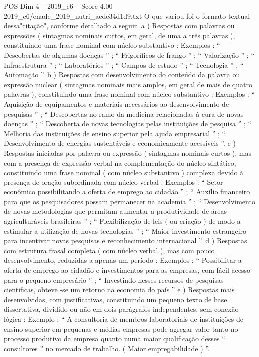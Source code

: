 \begin{textsample}{POS Dim 4 – 2019\_c6 – Score 4.00 – 2019\_c6/enade\_2019\_nutri\_acdc34d1d9.txt}
O que variou foi o formato textual dessa"citação", conforme detalhado a seguir. a ) Respostas com palavras ou expressões ( sintagmas nominais curtos, em geral, de uma a três palavras ), constituindo uma frase nominal com núcleo substantivo : Exemplos : “ Descobertas de algumas doenças ” ; “ Frigoríficos de frango ” ; “ Valorização ” ; “ Infraestrutura ” ; “ Laboratórios ” ; “ Campos de estudo ” ; “ Tecnologia ” ; “ Automação ”. b ) Respostas com desenvolvimento do conteúdo da palavra ou expressão nuclear ( sintagmas nominais mais amplos, em geral de mais de quatro palavras ), constituindo uma frase nominal com núcleo substantivo : Exemplos : “ Aquisição de equipamentos e materiais necessários ao desenvolvimento de pesquisas ” ; “ Descobertas no ramo da medicina relacionadas à cura de novas doenças ” ; “ Descoberta de novas tecnologias pelas instituições de pesquisa ” ; “ Melhoria das instituições de ensino superior pela ajuda empresarial ” ; “ Desenvolvimento de energias sustentáveis e economicamente acessíveis ”. c ) Respostas iniciadas por palavra ou expressão ( sintagmas nominais curtos ), mas com a presença de expressão verbal na complementação do núcleo sintático, constituindo uma frase nominal ( com núcleo substantivo ) complexa devido à presença de oração subordinada com núcleo verbal : Exemplos : “ Setor econômico possibilitando a oferta de emprego ao cidadão ” ; “ Auxílio financeiro para que os pesquisadores possam permanecer na academia ” ; “ Desenvolvimento de novas metodologias que permitam aumentar a produtividade de áreas agriculturáveis brasileiras ” ; “ Flexibilização de leis ( ou criação ) de modo a estimular a utilização de novas tecnologias ” ; “ Maior investimento estrangeiro para incentivar novas pesquisas e reconhecimento internacional ”. d ) Respostas com estrutura frasal completa ( com núcleo verbal ), mas com pouco desenvolvimento, reduzidas a apenas um período : Exemplos : “ Possibilitar a oferta de emprego ao cidadão e investimentos para as empresas, com fácil acesso para o pequeno empresário ” ; “ Investindo nesses recursos de pesquisas cientificas, obteve -se um retorno na economia do país ” e ) Respostas mais desenvolvidas, com justificativas, constituindo um pequeno texto de base dissertativa, dividido ou não em dois parágrafos independentes, sem conexão lógica : Exemplo : “ A consultoria de membros laboratoriais de instituições de ensino superior em pequenas e médias empresas pode agregar valor tanto no processo produtivo da empresa quanto numa maior qualificação desses “ consultores ” no mercado de trabalho. ( Maior empregabilidade ) ”.

\end{textsample}
